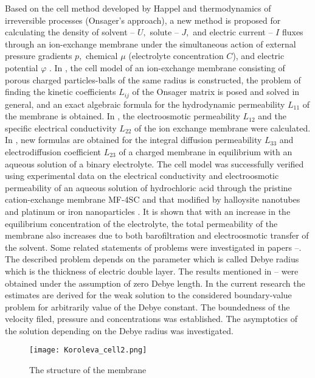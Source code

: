 \documentclass[12pt]{llncs}
\begin{document}
Based on the cell method developed by Happel and thermodynamics of irreversible processes (Onsager’s approach), a new method is proposed for calculating the density of solvent – $U,$ solute – $J,$ and electric current – $I$ fluxes through an ion-exchange membrane under the simultaneous action of external pressure gradients $p,$ chemical $\mu$ (electrolyte concentration $C$), and electric potential $\varphi$ \cite{Fil1}. In \cite{Fil1}, the cell model of an ion-exchange membrane consisting of porous charged particles-balls of the same radius is constructed, the problem of finding the kinetic coefficients $L_{ij}$ of the Onsager matrix is posed and solved in general, and an exact algebraic formula for the hydrodynamic permeability $L_{11}$ of the membrane is obtained. In \cite{Fil2}, the electroosmotic permeability $L_{12}$ and the specific electrical conductivity $L_{22}$ of the ion exchange membrane were calculated. In \cite{Fil3}, new formulas are obtained for the integral diffusion permeability $L_{33}$ and electrodiffusion coefficient $L_{23}$ of a charged membrane in equilibrium with an aqueous solution of a binary electrolyte. The cell model was successfully verified using experimental data on the electrical conductivity and electroosmotic permeability of an aqueous solution of hydrochloric acid through the pristine cation-exchange membrane MF-4SC and that modified by halloysite nanotubes and platinum or iron nanoparticles \cite{Fil4}. It is shown that with an increase in the equilibrium concentration of the electrolyte, the total permeability of the membrane also increases due to both barofiltration and electroosmotic transfer of the solvent. Some related statements of problems were investigated in papers \cite{rel2}--\cite{rel3}. The described problem depends on the parameter which is called Debye radius which is the thickness of electric double layer. The results mentioned in \cite{Fil1}--\cite{Fil4} were obtained under the assumption of zero Debye length. In the current research the estimates are derived for the weak solution to the considered boundary-value problem for arbitrarily value of the Debye constant. The boundedness of the velocity filed, pressure and concentrations was established.  The asymptotics of the solution depending on the Debye radius was investigated.
\vspace{2cm}


\begin{center}
\begin{figure}[ht]
\centering
\texttt{[image: Koroleva\_cell2.png]}
\caption{The structure of the membrane}
 \end{figure}
\end{center}
\end{document}
